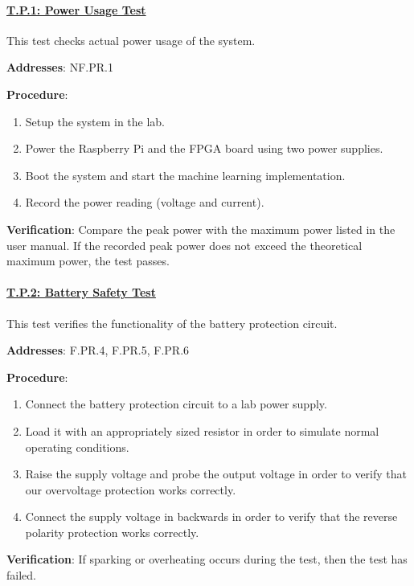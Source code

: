 \paragraph{\underline{T.P.1: Power Usage Test}}

This test checks actual power usage of the system.

\textbf{Addresses}: NF.PR.1

\textbf{Procedure}:
\begin{enumerate}[noitemsep]
    \item Setup the system in the lab.
    \item Power the Raspberry Pi and the FPGA board using two power supplies.
    \item Boot the system and start the machine learning implementation.
    \item Record the power reading (voltage and current).
\end{enumerate}

\textbf{Verification}: 
Compare the peak power with the maximum power listed in the user manual. If the recorded peak power does not exceed the theoretical maximum power, the test passes. 

%

\paragraph{\underline{T.P.2: Battery Safety Test}}

This test verifies the functionality of the battery protection circuit.

\textbf{Addresses}: F.PR.4, F.PR.5, F.PR.6

\textbf{Procedure}:
\begin{enumerate}[noitemsep]
    \item Connect the battery protection circuit to a lab power supply.
    \item Load it with an appropriately sized resistor in order to simulate normal operating conditions.
    \item Raise the supply voltage and probe the output voltage in order to verify that our overvoltage protection works correctly.
    \item Connect the supply voltage in backwards in order to verify that the reverse polarity protection works correctly.
\end{enumerate}

\textbf{Verification}: 
If sparking or overheating occurs during the test, then the test has failed.